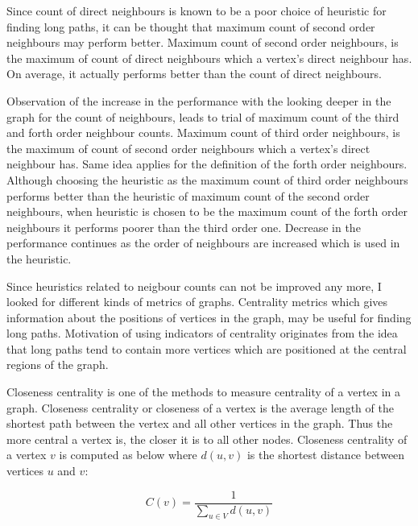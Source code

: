 \documentclass[12pt]{report}
\newcommand\ddfrac[2]{\frac{\displaystyle #1}{\displaystyle #2}}
\begin{document}
            Since count of direct neighbours is known to be a poor choice of heuristic for finding long paths, it can be thought that maximum count of second order neighbours may 
            perform better. Maximum count of second order neighbours, is the maximum of count of direct neighbours which a vertex's direct neighbour has. On average, it actually 
            performs better than the count of direct neighbours.

            Observation of the increase in the performance with the looking deeper in the graph for the count of neighbours, leads to trial of maximum count of the third and forth order neighbour 
            counts. Maximum count of third order neighbours, is the maximum of count of second order neighbours which a vertex's direct neighbour has. Same idea applies for the
            definition of the forth order neighbours. Although choosing the heuristic as the maximum count of third order neighbours performs better than the heuristic of maximum 
            count of the second order neighbours, when heuristic is chosen to be the maximum count of the forth order neighbours it performs poorer than the third order one. 
            Decrease in the performance continues as the order of neighbours are increased which is used in the heuristic.
        
            Since heuristics related to neigbour counts can not be improved any more, I looked for different kinds of metrics of graphs. Centrality metrics which gives information
            about the positions of vertices in the graph, may be useful for finding long paths. Motivation of using indicators of centrality originates from the idea that long paths
            tend to contain more vertices which are positioned at the central regions of the graph.   

            Closeness centrality is one of the methods to measure centrality of a vertex in a graph. Closeness centrality or closeness of a vertex is the average length of the 
            shortest path between the vertex and all other vertices in the graph. Thus the more central a vertex is, the closer it is to all other nodes.
            Closeness centrality of a vertex $v$ is computed as below where $d(u,v)$ is the shortest distance between vertices $u$ and $v$:
            
            \begin{equation}
                C(v) = \ddfrac{1}{\sum_{u \in V} d(u,v)}
            \end{equation}
            \bigskip
\end{document}
